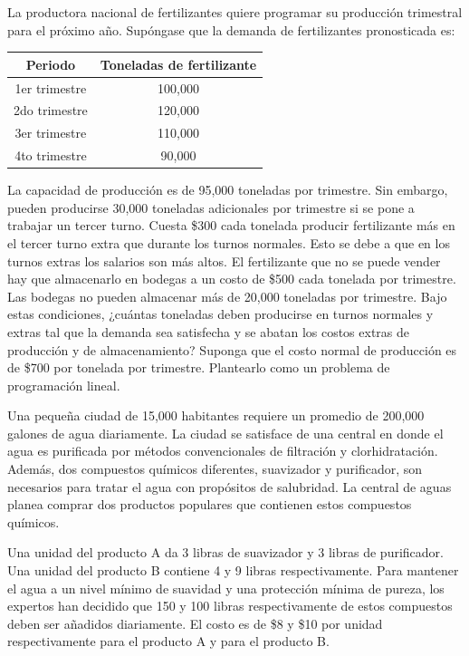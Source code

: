 \begin{Ejer}
La productora nacional de fertilizantes quiere programar su producci\'on trimestral para el pr\'oximo a\~no. Sup\'ongase que la demanda de fertilizantes pronosticada es:

\begin{center}
\begin{tabular}{c|c}
Periodo & Toneladas de fertilizante \\
\hline
1er trimestre & 100,000 \\
2do trimestre & 120,000 \\
3er trimestre & 110,000 \\
4to trimestre & 90,000 \\
\end{tabular}
\end{center}

La capacidad de producci\'on es de 95,000 toneladas por trimestre. Sin embargo, pueden producirse 30,000 toneladas adicionales por trimestre si se pone a trabajar un tercer turno. Cuesta \$300 cada tonelada producir fertilizante m\'as en el tercer turno extra que durante los turnos normales. Esto se debe a que en los turnos extras los salarios son m\'as altos. El fertilizante que no se puede vender hay que almacenarlo en bodegas a un costo de \$500 cada tonelada por trimestre. Las bodegas no pueden almacenar m\'as de 20,000 toneladas por trimestre. Bajo estas condiciones, ¿cu\'antas toneladas deben producirse en turnos normales y extras tal que la demanda sea satisfecha y se abatan los costos extras de producci\'on y de almacenamiento? Suponga que el costo normal de producci\'on es de \$700 por tonelada por trimestre. Plantearlo como un problema de programaci\'on lineal.
\end{Ejer}

\begin{Ejer}
Una peque\~na ciudad de 15,000 habitantes requiere un promedio de 200,000 galones de agua diariamente. La ciudad se satisface de una central en donde el agua es purificada por m\'etodos convencionales de filtraci\'on y clorhidrataci\'on. Adem\'as, dos compuestos qu\'imicos diferentes, suavizador y purificador, son necesarios para tratar el agua con prop\'ositos de salubridad. La central de aguas planea comprar dos productos populares que contienen estos compuestos qu\'imicos.

Una unidad del producto A da 3 libras de suavizador y 3 libras de purificador. Una unidad del producto B contiene 4 y 9 libras respectivamente. Para mantener el agua a un nivel m\'inimo de suavidad y una protecci\'on m\'inima de pureza, los expertos han decidido que 150 y 100 libras respectivamente de estos compuestos deben ser a\~nadidos diariamente. El costo es de \$8 y \$10 por unidad respectivamente para el producto A y para el producto B.
\end{Ejer}


